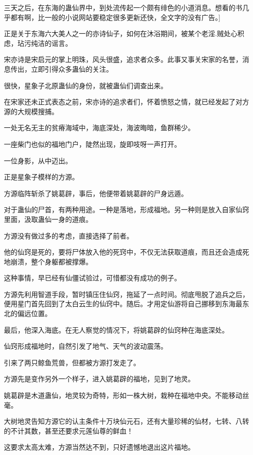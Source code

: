 
\begin{this_body}

三天之后，在东海的蛊仙界中，到处流传起一个颇有绯色的小道消息。想看的书几乎都有啊，比一般的小说网站要稳定很多更新还快，全文字的没有广告。]

正是关于东海六大美人之一的亦诗仙子，如何在沐浴期间，被某个老淫.贼处心积虑，玷污纯洁的谣言。

宋亦诗是宋启元的掌上明珠，风头很盛，追求者众多。此事又事关宋家的名誉，消息传出，立即引得众多蛊仙的关注。

很快，星象子北原蛊仙的身份，就被蛊仙们调查出来。

在宋家还未正式表态之前，宋亦诗的追求者们，怀着愤怒之情，就已经发起了对方源的大规模搜捕。

一处无名无主的贫瘠海域中，海底深处，海波晦暗，鱼群稀少。

一座柴门也似的福地门户，陡然出现，旋即吱呀一声打开。

一位身影，从中迈出。

正是星象子模样的方源。

方源临阵斩杀了姚葛辟，事后，他便带着姚葛辟的尸身远遁。

对于蛊仙的尸首，有两种用途。一种是落地，形成福地。另一种则是放入自家仙窍里面，汲取蛊仙一身的道痕。

方源没有做过多的考虑，直接选择了前者。

他的仙窍是死的，要将尸体放入他的死窍中，不仅无法获取道痕，而且还会造成死地崩溃，整个身躯都被撑爆。

这种事情，早已经有仙僵试验过，可惜都没有成功的例子。

方源先利用智道手段，暂时镇压住仙窍，拖延了一点时间。彻底甩脱了追兵之后，便用星门首先回到了太白云生的仙窍中。随后。才用定仙游将自己挪移到东海最东北的偏远位置。

最后，他深入海底。在无人察觉的情况下，将姚葛辟的仙窍种在海底深处。

仙窍形成福地时，自然引发了地气、天气的波动震荡。

引来了两只鲸鱼荒兽，但都被方源打发走了。

方源先是变作另外一个样子，进入姚葛辟的福地，见到了地灵。

姚葛辟是木道蛊仙，地灵较为奇特，形如一株大树，栽种在福地中央。不能移动丝毫。

大树地灵告知方源它的认主条件十万块仙元石，还有大量珍稀的仙材，七转、八转的不计其数，甚至还要求元莲仙尊的鲜血！

这要求太高太难，方源当然达不到，只好遗憾地退出这片福地。


\end{this_body}

